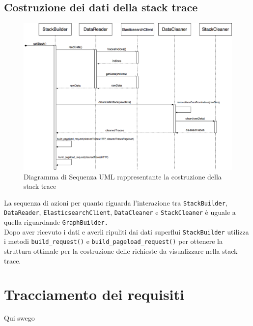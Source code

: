 \subsection{Costruzione dei dati della stack trace}
\begin{figure}[H]
	\centering
	\includegraphics[width=1\textwidth]{Images/DiagrammaSequenzaStack.png}
	\caption{Diagramma di Sequenza UML rappresentante la costruzione della stack trace}
	\label{img:seqGraph}
\end{figure}
La sequenza di azioni per quanto riguarda l'interazione tra \texttt{StackBuilder}, \texttt{DataReader}, \texttt{ElasticsearchClient}, \texttt{DataCleaner} e \texttt{StackCleaner} è uguale a quella riguardande \texttt{GraphBuilder.}\\
Dopo aver ricevuto i dati e averli ripuliti dai dati superflui \texttt{StackBuilder} utilizza i metodi \texttt{build\_request()} e \texttt{build\_pageload\_request()} per ottenere la struttura ottimale per la costruzione delle richieste da visualizzare nella stack trace.


\section{Tracciamento dei requisiti}
\label{sec:Tracciamento}
Qui swego 
